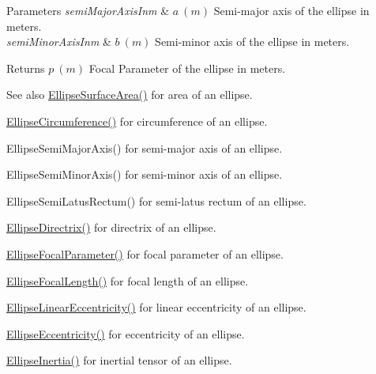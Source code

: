 \begin{DoxyParams}{Parameters}
{\em semi\+Major\+Axis\+Inm} & $ a\ (m)$ Semi-\/major axis of the ellipse in meters. \\
\hline
{\em semi\+Minor\+Axis\+Inm} & $ b\ (m)$ Semi-\/minor axis of the ellipse in meters. \\
\hline
\end{DoxyParams}
\begin{DoxyReturn}{Returns}
$ p\ (m)$ Focal Parameter of the ellipse in meters. 
\end{DoxyReturn}
\begin{DoxySeeAlso}{See also}
\mbox{\hyperlink{group___e_g_x_math-_geometry-2_d-_ellipse-_surface_area_ga4ce8c8323e9718ce5458f4ab7f6d823d}{Ellipse\+Surface\+Area()}} for area of an ellipse. 

\mbox{\hyperlink{group___e_g_x_math-_geometry-2_d-_ellipse-_circumference_ga4172802ac674eb53467b44928ac635c7}{Ellipse\+Circumference()}} for circumference of an ellipse. 

Ellipse\+Semi\+Major\+Axis() for semi-\/major axis of an ellipse. 

Ellipse\+Semi\+Minor\+Axis() for semi-\/minor axis of an ellipse. 

Ellipse\+Semi\+Latus\+Rectum() for semi-\/latus rectum of an ellipse. 

\mbox{\hyperlink{group___e_g_x_math-_geometry-2_d-_ellipse-_directrix_gace8f72a8efbc9c18d3eb689151405106}{Ellipse\+Directrix()}} for directrix of an ellipse. 

\mbox{\hyperlink{group___e_g_x_math-_geometry-2_d-_ellipse-_focal_parameter_ga4cd01a38c72c092ef9791351948bf69b}{Ellipse\+Focal\+Parameter()}} for focal parameter of an ellipse. 

\mbox{\hyperlink{group___e_g_x_math-_geometry-2_d-_ellipse-_focal_length_gab8d63de7640c880cfecaeada6f2afdac}{Ellipse\+Focal\+Length()}} for focal length of an ellipse. 

\mbox{\hyperlink{group___e_g_x_math-_geometry-2_d-_ellipse-_linear_eccentricity_gac70b3010e30aa8b73deb50fe2b9b9a91}{Ellipse\+Linear\+Eccentricity()}} for linear eccentricity of an ellipse. 

\mbox{\hyperlink{group___e_g_x_math-_geometry-2_d-_ellipse-_eccentricity_ga6a0a7fba17f782616894cfc447628c33}{Ellipse\+Eccentricity()}} for eccentricity of an ellipse. 

\mbox{\hyperlink{group___e_g_x_math-_geometry-2_d-_ellipse-_inertia_ga10a3049c2f04b50f271fb01dc62e4cf8}{Ellipse\+Inertia()}} for inertial tensor of an ellipse. 
\end{DoxySeeAlso}
